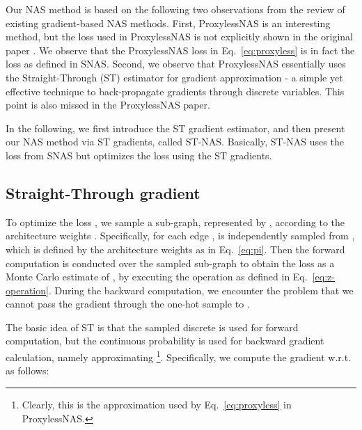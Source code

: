 \documentclass{article}
\newcommand{\neqref}{Eq.~\eqref}
\begin{document}
Our NAS method is based on the following two observations from the review of existing gradient-based NAS methods.
First, ProxylessNAS is an interesting method, but the loss  used in ProxylessNAS is not explicitly shown in the original paper \cite{cai2018proxelessnas}. We observe that the ProxylessNAS loss  in \neqref{eq:proxyless} is in fact the loss  as defined in SNAS.
Second, we observe that ProxylessNAS essentially uses the Straight-Through (ST) estimator \cite{bengio2013estimating} for gradient approximation - a simple yet effective technique to back-propagate gradients through discrete variables. This point is also missed in the ProxylessNAS paper.

In the following, we first introduce the ST gradient estimator, and then present our NAS method via ST gradients, called ST-NAS. Basically, ST-NAS uses the loss from SNAS but optimizes the loss using the ST gradients.

\subsection{Straight-Through gradient}
To optimize the loss , we sample a sub-graph, represented by , according to the architecture weights .
Specifically, for each edge ,  is independently sampled from , which is defined by the architecture weights  as in \neqref{eq:pi}.
Then the forward computation is conducted over the sampled sub-graph to obtain the loss  as a Monte Carlo estimate of , by executing the operation as defined in \neqref{eq:z-operation}.
During the backward computation, we encounter the problem that we cannot pass the gradient through the one-hot sample  to .

The basic idea of ST is that the sampled discrete  is used for forward computation, but the continuous probability  is used for backward gradient calculation, namely approximating \footnote{Clearly, this is the approximation used by \neqref{eq:proxyless} in ProxylessNAS.}. Specifically, we compute the gradient w.r.t.~ as follows:
\end{document}
